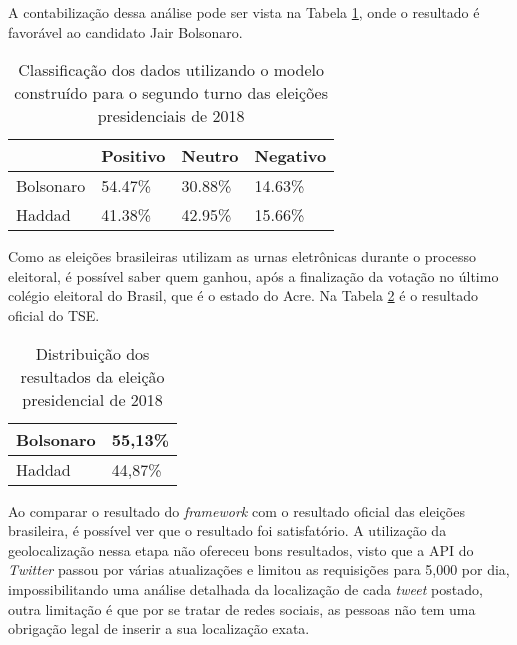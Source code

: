 %

A contabilização dessa análise pode ser vista na Tabela \ref{tb:bolso_haddad}, onde o resultado é favorável ao candidato Jair Bolsonaro.


\begin{table}
    \label{tb:bolso_haddad}
    \centering
    \caption{Classificação dos dados utilizando o modelo construído para o segundo turno das eleições presidenciais de 2018}
   
    \begin{tabular}{llll}
    \hline
              & Positivo & Neutro & Negativo \\ \hline
    Bolsonaro  & 54.47\%  & 30.88\% & 14.63\%  \\ \hline
    Haddad     & 41.38\%  & 42.95\% & 15.66\%  \\ \hline
    \end{tabular}
\end{table}


Como as eleições brasileiras utilizam as urnas eletrônicas durante o processo eleitoral, é possível saber 
quem ganhou, após a finalização da votação no último colégio eleitoral do Brasil, que é o estado do Acre. Na Tabela
\ref{tb:tse2018} é o resultado oficial do \acrshort{TSE}.


\begin{table}[tbp]
    \centering
    \caption{Distribuição dos resultados da eleição presidencial de 2018}
    \label{tb:tse2018}
    \begin{tabular}{ll}
    \hline
    Bolsonaro & 55,13\% \\ \hline
    Haddad & 44,87\% \\ \hline
    \end{tabular}
\end{table}


Ao comparar o resultado do \textit{framework} com o resultado oficial das eleições brasileira, é possível ver 
que o resultado foi satisfatório. A utilização da geolocalização nessa etapa não ofereceu bons resultados, visto que
a \acrshort{API} do \textit{Twitter} passou por várias atualizações e limitou as requisições para 5,000 por dia, impossibilitando 
uma análise detalhada da localização de cada \textit{tweet} postado, outra limitação é que por se tratar de redes sociais, as pessoas
não tem uma obrigação legal de inserir a sua localização exata.